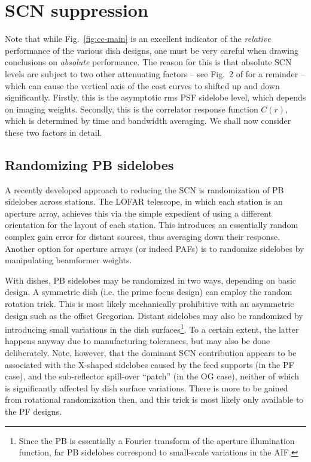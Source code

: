 \documentclass{aa}
\begin{document}
\section{SCN suppression}

Note that while Fig.~\ref{fig:cc-main} is an excellent indicator of the \emph{relative} performance of the various dish designs, one must be very careful when drawing conclusions on \emph{absolute} performance. The reason for this is that absolute SCN levels are subject to two other attenuating factors -- see Fig.~2 of \citet{SKA54-expa,SKA54} for a reminder -- which can cause the vertical axis of the cost curves to shifted up and down significantly. Firstly, this is the asymptotic rms PSF sidelobe level, which depends on imaging weights. Secondly, this is the correlator response function $C(r)$, which is determined by time and bandwidth averaging. We shall now consider these two factors in detail.

\subsection{Randomizing PB sidelobes}
\label{sec:randomizing}

A recently developed approach to reducing the SCN is randomization of PB sidelobes across stations. The LOFAR telescope, in which each station is an aperture array, achieves this via the simple expedient of using a different orientation for the layout of each station. This introduces an essentially random complex gain error for distant sources, thus averaging down their response. Another option for aperture arrays (or indeed PAFs) is to randomize sidelobes by manipulating beamformer weights.

With dishes, PB sidelobes may be randomized in two ways, depending on basic design. A symmetric dish (i.e. the prime focus design) can employ the random rotation trick. This is most likely mechanically prohibitive with an asymmetric design such as the offset Gregorian. Distant sidelobes may also be randomized by introducing small variations in the dish surfaces\footnote{Since the PB is essentially a Fourier transform of the aperture illumination function, far PB sidelobes correspond to small-scale variations in the AIF.}. To a certain extent, the latter happens anyway due to manufacturing tolerances, but may also be done deliberately. Note, however, that the dominant SCN contribution appears to be associated with the X-shaped sidelobes caused by the feed supports (in the PF case), and the sub-reflector spill-over ``patch'' (in the OG case), neither of which is significantly affected by dish surface variations. There is more to be gained from rotational randomization then, and this trick is most likely only 
available to the PF designs.
\end{document}
